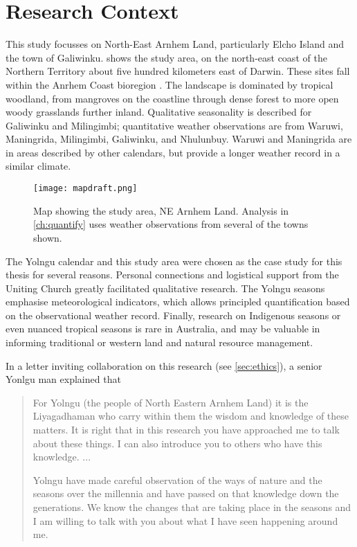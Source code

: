 \section{Research Context}
\label{sec:context}

This study focusses on North-East Arnhem Land, particularly Elcho Island
and the town of Galiwinku.   shows the study
area, on the north-east coast of the Northern Territory about five hundred
kilometers east of Darwin.
%
These sites fall within the Anrhem Coast bioregion \citep{ens2014}.
The landscape is dominated by tropical woodland, from mangroves on the coastline
through dense forest to more open woody grasslands further inland.
%
Qualitative seasonality is described for Galiwinku and Milingimbi;
quantitative weather observations are from Waruwi, Maningrida, Milingimbi,
Galiwinku, and Nhulunbuy.  Waruwi and Maningrida are in areas described by
other calendars, but provide a longer weather record in a similar climate.

\begin{figure}[h]
    \centering
    \texttt{[image: mapdraft.png]}
    \caption[Map showing the study area, NE Arnhem Land]{
        Map showing the study area, NE Arnhem Land.
        Analysis in \cref{ch:quantify} uses weather observations from several of the towns shown.
        }
    \label{fig:arnhem-map}
\end{figure}

The Yolngu calendar and this study area were chosen as the case study for
this thesis for several reasons.  Personal connections and logistical support
from the Uniting Church greatly facilitated qualitative research.  The
Yolngu seasons emphasise meteorological indicators, which allows principled
quantification based on the observational weather record.  Finally, research
on Indigenous seasons or even nuanced tropical seasons is rare in Australia,
and may be valuable in informing traditional or western land and natural
resource management.

In a letter inviting collaboration on this research (see \cref{sec:ethics}),
a senior Yonlgu man explained that
\begin{quote}
    For Yolngu (the people of North Eastern Arnhem Land) it is the Liyagadhaman
    who carry within them the wisdom and knowledge of these matters.
    It is right that in this research you have approached me to talk about these
    things. I can also introduce you to others who have this knowledge.  ...

    Yolngu have made careful observation of the ways of nature and the seasons
    over the millennia and have passed on that knowledge down the generations.
    We know the changes that are taking place in the seasons and I am willing
    to talk with you about what I have seen happening around me.
\end{quote}

